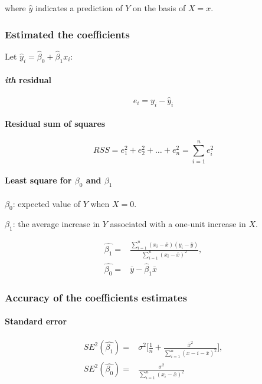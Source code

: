 \documentclass[a4paper]{article}
\begin{document}
			where $\hat{y}$ indicates a prediction of $Y$ on the basis of $X=x$.
		
			\subsubsection{Estimated the coefficients}
				Let $\hat{y}_i = \hat{\beta}_0 + \hat{\beta}_1 x_i$:			
				\paragraph{\textit{ith} residual}
				\begin{equation}
					e_i = y_i - \hat{y}_i 
				\end{equation}
				
				\paragraph{Residual sum of squares}
				\begin{equation}\label{eq:RSS}
					RSS = e_1^2 + e_2^2 + \dots + e_n^2 = \sum_{i=1}^n e_i^2
				\end{equation}		
				
				\paragraph{Least square for $\beta_0$ and $\beta_1$}
				\begin{description}
					\item $\beta_0$: expected value of $Y$ when $X = 0$.
					\item $\beta_1$: the average increase in $Y$ associated with a one-unit increase in $X$.		
				\end{description}
				
				\begin{align}
						\hat{\beta_1} ={}& \frac{\sum_{i=1}^n (x_i - \bar{x})(y_i - \bar{y})}{\sum_{i=1}^n(x_i - \bar{x})^2},
				\\
						\hat{\beta_0} ={}& \bar{y} - \hat{\beta}_1 \bar{x}
				\end{align}
				
			\subsubsection{Accuracy of the coefficients estimates}
				
				\paragraph{Standard error}
				\begin{align}
					SE^2(\hat{\beta_1}) ={}& \sigma^2 \Bigg[ \frac{1}{n} + \frac{\bar{x}^2}{\sum_{i=1}^{n}(x-i - \bar{x})^2} \Bigg], 
					\\
					SE^2(\hat{\beta_0}) ={}& \frac{\sigma^2}{\sum_{i=1}^n(x_i - \bar{x})^2}
				\end{align}		
				
\end{document}
